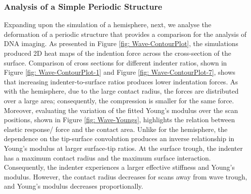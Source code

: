 \subsubsection{Analysis of a Simple Periodic Structure}
Expanding upon the simulation of a hemisphere, next, we analyse the deformation of a periodic structure that provides a comparison for the analysis of DNA imaging. As presented in Figure \ref{fig: Wave-ContourPlot}, the simulations produced 2D heat maps of the indention force across the cross-section of the surface. Comparison of cross sections for different indenter ratios, shown in Figure \ref{fig: Wave-ContourPlot-1} and Figure \ref{fig: Wave-ContourPlot-7}, shows that increasing indenter-to-surface ratios produces lower indentation forces. As with the hemisphere, due to the large contact radius, the forces are distributed over a large area; consequently, the compression is smaller for the same force. Moreover, evaluating the variation of the fitted Young's modulus over the scan positions, shown in Figure \ref{fig: Wave-Youngs},  highlights the relation between elastic response/ force and the contact area. Unlike for the hemisphere, the dependence on the tip-surface convolution produces an inverse relationship in Young's modulus at larger surface-tip ratios. At the surface trough, the indenter has a maximum contact radius and the maximum surface interaction. Consequently, the indenter experiences a larger effective stiffness and Young's modulus. However, the contact radius decreases for scans away from wave trough, and Young's modulus decreases proportionally.

